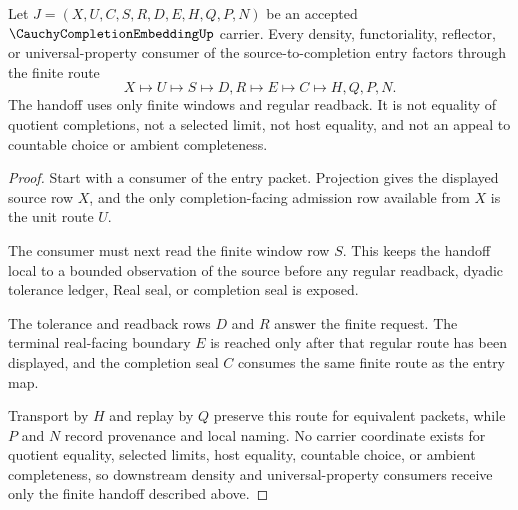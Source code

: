 \begin{theorem}
\label{thm:cauchy-completion-embedding-density-handoff}
Let $J=(X,U,C,S,R,D,E,H,Q,P,N)$ be an accepted $\CauchyCompletionEmbeddingUp$ carrier. Every density, functoriality, reflector, or universal-property consumer of the source-to-completion entry factors through the finite route
$$
X\longmapsto U\longmapsto S\longmapsto D,R\longmapsto E\longmapsto C\longmapsto H,Q,P,N .
$$
The handoff uses only finite windows and regular readback. It is not equality of quotient completions, not a selected limit, not host equality, and not an appeal to countable choice or ambient completeness.
\end{theorem}
\begin{proof}
Start with a consumer of the entry packet. Projection gives the displayed source row $X$, and the only completion-facing admission row available from $X$ is the unit route $U$.

The consumer must next read the finite window row $S$. This keeps the handoff local to a bounded observation of the source before any regular readback, dyadic tolerance ledger, Real seal, or completion seal is exposed.

The tolerance and readback rows $D$ and $R$ answer the finite request. The terminal real-facing boundary $E$ is reached only after that regular route has been displayed, and the completion seal $C$ consumes the same finite route as the entry map.

Transport by $H$ and replay by $Q$ preserve this route for equivalent packets, while $P$ and $N$ record provenance and local naming. No carrier coordinate exists for quotient equality, selected limits, host equality, countable choice, or ambient completeness, so downstream density and universal-property consumers receive only the finite handoff described above.
\end{proof}

